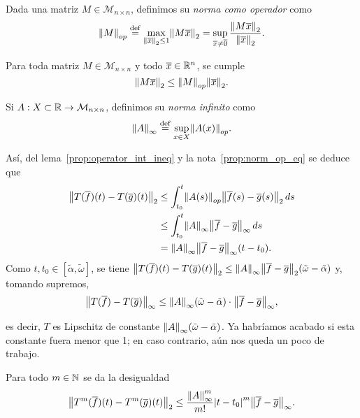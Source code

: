\documentclass[../ecuaciones_diferenciales.tex]{subfiles}
\begin{document}
\begin{definition}
	Dada una matriz \(M \in \mathcal{M}_{n \times n}\), definimos su \emph{norma
	como operador} como
	\[\norm{M}_{op} \eqdef \max_{\norm{\vec{x}}_2 \leq 1} \norm{M \vec{x}}_2
		= \sup_{\vec{x} \neq \vec{0}}
			\frac{\norm{M \vec{x}}_2}{\norm{\vec{x}}_2}.\]
\end{definition}

\begin{remark} \label{prop:norm_op_eq}
	Para toda matriz \(M \in \mathcal{M}_{n \times n}\) y todo
	\(\overline{x} \in \mathbb{R}^n\), se cumple
	\[\norm{M \vec{x}}_2 \leq \norm{M}_{op} \norm{\vec{x}}_2.\]
\end{remark}

\begin{definition}
	Si \(A : X \subset \mathbb{R} \to \mathcal{M}_{n \times n}\), definimos su \emph{norma
	infinito} como
	\[\norm{A}_\infty \eqdef \sup_{x \in X} \norm{A(x)}_{op}.\]
\end{definition}

Así, del lema~\ref{prop:operator_int_ineq} y la nota~\ref{prop:norm_op_eq} se
deduce que
\begin{align*}
	\norm{T(\vec{f})(t) - T(\vec{g})(t)}_2
	&\leq \int_{t_0}^t \norm{A(s)}_{op} \norm{\vec{f}(s) - \vec{g}(s)}_2 \dif s
	\\
	&\leq \int_{t_0}^t \norm{A}_\infty \norm{\vec{f} - \vec{g}}_\infty \dif s \\
	&= \norm{A}_\infty\norm{\vec{f} - \vec{g}}_\infty(t - t_0).
\end{align*}
Como \(t, t_0 \in [\tilde{\alpha}, \tilde{\omega}]\), se tiene
\(\norm{T(\vec{f})(t) - T(\vec{g})(t)}_2
	\leq \norm{A}_\infty\norm{\vec{f} - \vec{g}}_2
		(\tilde{\omega} - \tilde{\alpha})\) y, tomando supremos,
\[\norm{T(\vec{f}) - T(\vec{g})}_\infty
	\leq \norm{A}_\infty(\tilde{\omega}
	- \tilde{\alpha}) \cdot \norm{\vec{f} - \vec{g}}_\infty,\]

es decir, \(T\) es Lipschitz de constante
\(\norm{A}_\infty(\tilde{\omega}-\tilde{\alpha})\). Ya habríamos acabado si esta
constante fuera menor que 1; en caso contrario, aún nos queda un poco de
trabajo.

\begin{lemma} \label{lem:desinfty}
	Para todo \(m \in \mathbb{N}\) se da la desigualdad
	\[\norm{T^m(\vec{f})(t) - T^m(\vec{g})(t)}_2
		\leq \frac{\norm{A}^m_\infty}{m!} \abs{t - t_0}^m
			\norm{\vec{f} - \vec{g}}_\infty.\]
\end{lemma}
\end{document}

